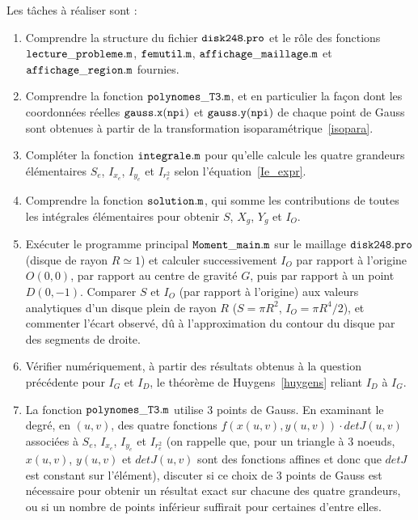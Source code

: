 \documentclass[a4paper, 10pt]{article}
\newcommand{\matlabscript}[2]
  {\begin{itemize}\item[]\end{itemize}}
\begin{document}
Les tâches à réaliser sont :

\begin{enumerate}
\item  Comprendre la structure du fichier $\tt{disk248.pro} \rm$ et le rôle des fonctions
$\tt{lecture\_probleme.m}\rm$, $\tt{femutil.m}\rm$, $\tt{affichage\_maillage.m}\rm$ et
$\tt{affichage\_region.m}\rm$ fournies.
\item Comprendre la fonction $\tt{polynomes\_T3.m}\rm$, et en particulier la façon dont les
coordonnées réelles $\tt{gauss.x(npi)}\rm$ et $\tt{gauss.y(npi)}\rm$ de chaque point de Gauss
sont obtenues à partir de la transformation isoparamétrique~\eqref{isopara}.
\item Compléter la fonction $\tt{integrale.m} \rm$ pour qu'elle calcule les quatre grandeurs
élémentaires $S_e$, $I_{x_e}$, $I_{y_e}$ et $I_{r^2_e}$ selon l'équation~\eqref{Ie_expr}.
\item Comprendre la fonction $\tt{solution.m}\rm$, qui somme les contributions de toutes les
intégrales élémentaires pour obtenir $S$, $X_g$, $Y_g$ et $I_O$.
\item Exécuter le programme principal $\tt{Moment\_main.m} \rm$ sur le maillage
$\tt{disk248.pro}\rm$ (disque de rayon $R\simeq 1$) et calculer successivement $I_O$ par rapport
à l'origine $O(0,0)$, par rapport au centre de gravité $G$, puis par rapport à un point
$D(0,-1)$. Comparer $S$ et $I_O$ (par rapport à l'origine) aux valeurs analytiques d'un disque
plein de rayon $R$ ($S=\pi R^2$, $I_O=\pi R^4/2$), et commenter l'écart observé, dû à
l'approximation du contour du disque par des segments de droite.
\item Vérifier numériquement, à partir des résultats obtenus à la question précédente pour $I_G$
et $I_D$, le théorème de Huygens~\eqref{huygens} reliant $I_D$ à $I_G$.
\item  La fonction $\tt{polynomes\_T3.m} \rm$ utilise $3$ points de Gauss. En examinant le degré,
en $(u,v)$, des quatre fonctions $f(x(u,v),y(u,v))\cdot detJ(u,v)$ associées à $S_e$, $I_{x_e}$,
$I_{y_e}$ et $I_{r^2_e}$ (on rappelle que, pour un triangle à 3 noeuds, $x(u,v)$, $y(u,v)$ et
$detJ(u,v)$ sont des fonctions affines et donc que $detJ$ est constant sur l'élément), discuter
si ce choix de $3$ points de Gauss est nécessaire pour obtenir un résultat exact sur chacune des
quatre grandeurs, ou si un nombre de points inférieur suffirait pour certaines d'entre elles.
\end{enumerate} 

\end{document}
